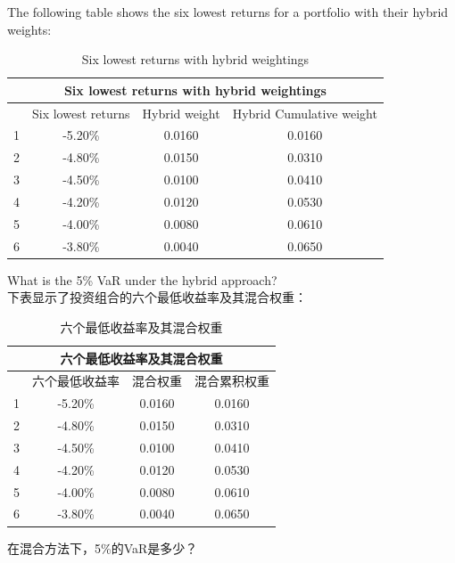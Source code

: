 \documentclass{article}
\newcounter{question} %
\begin{document}
\begin{question}
    The following table shows the six lowest returns for a portfolio with their hybrid weights:

    \begin{table}[H]
        \centering
        \begin{tabular}{|c|c|c|c|}
            \hline
            \multicolumn{4}{|c|}{Six lowest returns with hybrid weightings} \\
            \hline
            & Six lowest returns & Hybrid weight & Hybrid Cumulative weight \\
            \hline
            1 & -5.20\% & 0.0160 & 0.0160 \\
            2 & -4.80\% & 0.0150 & 0.0310 \\
            3 & -4.50\% & 0.0100 & 0.0410 \\
            4 & -4.20\% & 0.0120 & 0.0530 \\
            5 & -4.00\% & 0.0080 & 0.0610 \\
            6 & -3.80\% & 0.0040 & 0.0650 \\
            \hline
        \end{tabular}
        \caption{Six lowest returns with hybrid weightings}
    \end{table}
    What is the 5\% VaR under the hybrid approach?
\\    下表显示了投资组合的六个最低收益率及其混合权重：

\begin{table}[H]
    \centering
    \begin{tabular}{|c|c|c|c|}
        \hline
        \multicolumn{4}{|c|}{六个最低收益率及其混合权重} \\
        \hline
        & 六个最低收益率 & 混合权重 & 混合累积权重 \\
        \hline
        1 & -5.20\% & 0.0160 & 0.0160 \\
        2 & -4.80\% & 0.0150 & 0.0310 \\
        3 & -4.50\% & 0.0100 & 0.0410 \\
        4 & -4.20\% & 0.0120 & 0.0530 \\
        5 & -4.00\% & 0.0080 & 0.0610 \\
        6 & -3.80\% & 0.0040 & 0.0650 \\
        \hline
    \end{tabular}
    \caption{六个最低收益率及其混合权重}
\end{table}
在混合方法下，5\%的VaR是多少？
\end{question}
\end{document}
